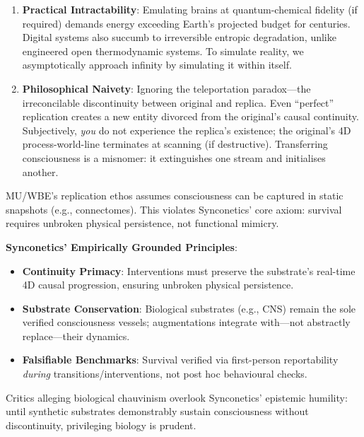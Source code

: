 \documentclass[10pt]{article}
\begin{document}
\begin{sloppypar}
\begin{enumerate}
    \item \textbf{Practical Intractability}: Emulating brains at quantum-chemical fidelity (if required) demands energy exceeding Earth’s projected budget for centuries. Digital systems also succumb to irreversible entropic degradation, unlike engineered open thermodynamic systems. To simulate reality, we asymptotically approach infinity by simulating it within itself.

    \item \textbf{Philosophical Naivety}: Ignoring the teleportation paradox—the irreconcilable discontinuity between original and replica. Even “perfect” replication creates a new entity divorced from the original’s causal continuity. Subjectively, \emph{you} do not experience the replica’s existence; the original’s 4D process-world-line terminates at scanning (if destructive). Transferring consciousness is a misnomer: it extinguishes one stream and initialises another.
  \end{enumerate}

  MU/WBE’s replication ethos assumes consciousness can be captured in static snapshots (e.g., connectomes). This violates Synconetics’ core axiom: survival requires unbroken physical persistence, not functional mimicry.

  \textbf{Synconetics’ Empirically Grounded Principles}:
  \begin{itemize}
    \item \textbf{Continuity Primacy}: Interventions must preserve the substrate’s real-time 4D causal progression, ensuring unbroken physical persistence.
    \item \textbf{Substrate Conservation}: Biological substrates (e.g., CNS) remain the sole verified consciousness vessels; augmentations integrate with—not abstractly replace—their dynamics.
    \item \textbf{Falsifiable Benchmarks}: Survival verified via first-person reportability \textit{during} transitions/interventions, not post hoc behavioural checks.
  \end{itemize}

  Critics alleging biological chauvinism overlook Synconetics’ epistemic humility: until synthetic substrates demonstrably sustain consciousness without discontinuity, privileging biology is prudent.


\end{sloppypar}
\end{document}
